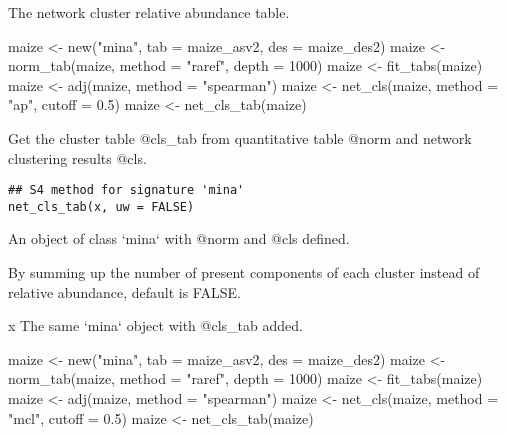 \documentclass[a4paper]{book}
\begin{document}
%
\begin{Value}
The network cluster relative abundance table.
\end{Value}
%
\begin{Examples}
\begin{ExampleCode}
maize <- new("mina", tab = maize_asv2, des = maize_des2)
maize <- norm_tab(maize, method = "raref", depth = 1000)
maize <- fit_tabs(maize)
maize <- adj(maize, method = "spearman")
maize <- net_cls(maize, method = "ap", cutoff = 0.5)
maize <- net_cls_tab(maize)
\end{ExampleCode}
\end{Examples}
%
\begin{Description}\relax
Get the cluster table @cls\_tab from quantitative table @norm and network
clustering results @cls.
\end{Description}
%
\begin{Usage}
\begin{verbatim}
## S4 method for signature 'mina'
net_cls_tab(x, uw = FALSE)
\end{verbatim}
\end{Usage}
%
\begin{Arguments}
\begin{ldescription}
\item[\code{x}] An object of class `mina` with @norm and @cls defined.

\item[\code{uw}] By summing up the number of present components of each cluster
instead of relative abundance, default is FALSE.
\end{ldescription}
\end{Arguments}
%
\begin{Value}
x The same `mina` object with @cls\_tab added.
\end{Value}
%
\begin{Examples}
\begin{ExampleCode}
maize <- new("mina", tab = maize_asv2, des = maize_des2)
maize <- norm_tab(maize, method = "raref", depth = 1000)
maize <- fit_tabs(maize)
maize <- adj(maize, method = "spearman")
maize <- net_cls(maize, method = "mcl", cutoff = 0.5)
maize <- net_cls_tab(maize)
\end{ExampleCode}
\end{Examples}
\end{document}
